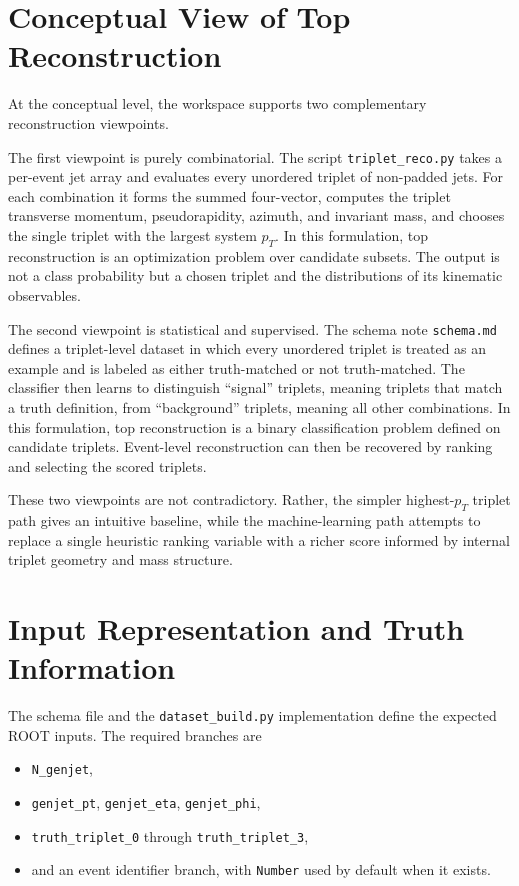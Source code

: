 \documentclass[11pt]{article}
\begin{document}
\section{Conceptual View of Top Reconstruction}

At the conceptual level, the workspace supports two complementary reconstruction viewpoints.

The first viewpoint is purely combinatorial. The script \texttt{triplet\_reco.py} takes a per-event jet array and evaluates every unordered triplet of non-padded jets. For each combination it forms the summed four-vector, computes the triplet transverse momentum, pseudorapidity, azimuth, and invariant mass, and chooses the single triplet with the largest system $p_T$. In this formulation, top reconstruction is an optimization problem over candidate subsets. The output is not a class probability but a chosen triplet and the distributions of its kinematic observables.

The second viewpoint is statistical and supervised. The schema note \texttt{schema.md} defines a triplet-level dataset in which every unordered triplet is treated as an example and is labeled as either truth-matched or not truth-matched. The classifier then learns to distinguish ``signal'' triplets, meaning triplets that match a truth definition, from ``background'' triplets, meaning all other combinations. In this formulation, top reconstruction is a binary classification problem defined on candidate triplets. Event-level reconstruction can then be recovered by ranking and selecting the scored triplets.

These two viewpoints are not contradictory. Rather, the simpler highest-$p_T$ triplet path gives an intuitive baseline, while the machine-learning path attempts to replace a single heuristic ranking variable with a richer score informed by internal triplet geometry and mass structure.

\section{Input Representation and Truth Information}

The schema file and the \texttt{dataset\_build.py} implementation define the expected ROOT inputs. The required branches are
\begin{itemize}[leftmargin=*]
  \item \texttt{N\_genjet},
  \item \texttt{genjet\_pt}, \texttt{genjet\_eta}, \texttt{genjet\_phi},
  \item \texttt{truth\_triplet\_0} through \texttt{truth\_triplet\_3},
  \item and an event identifier branch, with \texttt{Number} used by default when it exists.
\end{itemize}
\end{document}
